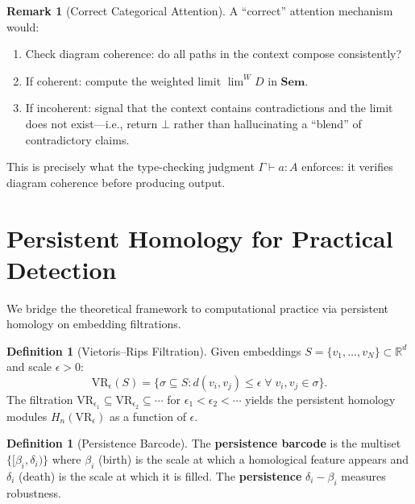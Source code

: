 \documentclass[11pt,a4paper]{article}
\theoremstyle{plain}
\theoremstyle{definition}
\newtheorem{definition}[theorem]{Definition}
\newtheorem{remark}[theorem]{Remark}
\newcommand{\Sem}{\mathbf{Sem}}
\newcommand{\VR}{\mathrm{VR}}
\begin{document}
\begin{remark}[Correct Categorical Attention]
A ``correct'' attention mechanism would:
\begin{enumerate}[nosep]
  \item Check diagram coherence: do all paths in the context compose consistently?
  \item If coherent: compute the weighted limit $\lim^W D$ in $\Sem$.
  \item If incoherent: signal that the context contains contradictions and the limit does not exist---i.e., return $\bot$ rather than hallucinating a ``blend'' of contradictory claims.
\end{enumerate}
This is precisely what the type-checking judgment $\Gamma \vdash a : A$ enforces: it verifies diagram coherence before producing output.
\end{remark}

\section{Persistent Homology for Practical Detection}\label{sec:persistent}

We bridge the theoretical framework to computational practice via persistent homology on embedding filtrations.

\begin{definition}[Vietoris--Rips Filtration]\label{def:vrfilt}
Given embeddings $S = \{v_1, \ldots, v_N\} \subset \mathbb{R}^d$ and scale $\epsilon > 0$:
\begin{equation}\label{eq:vr}
  \VR_\epsilon(S) = \{\sigma \subseteq S : d(v_i, v_j) \leq \epsilon \;\forall\; v_i, v_j \in \sigma\}.
\end{equation}
The filtration $\VR_{\epsilon_1} \subseteq \VR_{\epsilon_2} \subseteq \cdots$ for $\epsilon_1 < \epsilon_2 < \cdots$ yields the persistent homology modules $H_n(\VR_\epsilon)$ as a function of $\epsilon$.
\end{definition}

\begin{definition}[Persistence Barcode]\label{def:barcode}
The \textbf{persistence barcode} is the multiset $\{[\beta_i, \delta_i)\}$ where $\beta_i$ (birth) is the scale at which a homological feature appears and $\delta_i$ (death) is the scale at which it is filled. The \textbf{persistence} $\delta_i - \beta_i$ measures robustness.
\end{definition}
\end{document}
